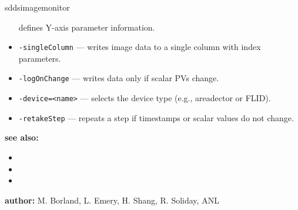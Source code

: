 \begin{sddsprog}{sddsimagemonitor}
\begin{itemize}
        defines Y-axis parameter information.
  \item {\tt -singleColumn} --- writes image data to a single column with index parameters.
  \item {\tt -logOnChange} --- writes data only if scalar PVs change.
  \item {\verb+-device=<name>+} --- selects the device type (e.g., areadector or FLID).
  \item {\tt -retakeStep} --- repeats a step if timestamps or scalar values do not change.
  \end{itemize}
\item {\bf see also:}
  \begin{itemize}
  \item {}
  \item {}
  \item {}
  \end{itemize}
\item {\bf author:} M. Borland, L. Emery, H. Shang, R. Soliday, ANL
\end{sddsprog}
